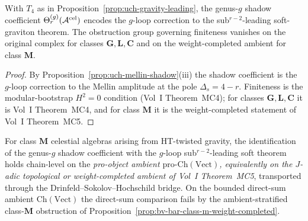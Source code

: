 \begin{proposition}
\label{prop:uch-gravity-higher-partial}
With $T_4$ as in Proposition~\ref{prop:uch-gravity-leading},
the genus-$g$ shadow coefficient
$\Theta_r^{(g)}(\mathcal A^{\mathrm{cel}})$ encodes the $g$-loop correction
to the sub${}^{r-2}$-leading soft-graviton theorem. The obstruction
group governing finiteness vanishes on the original complex for
classes $\mathbf G, \mathbf L, \mathbf C$ and on the
weight-completed ambient for class $\mathbf M$.
\end{proposition}

\begin{proof}
By Proposition~\ref{prop:uch-mellin-shadow}(iii) the shadow
coefficient is the $g$-loop correction to the Mellin amplitude at the
pole $\Delta_s = 4 - r$. Finiteness is the modular-bootstrap
$H^2 = 0$ condition (Vol~I Theorem~MC4); for classes
$\mathbf G, \mathbf L, \mathbf C$ it is Vol~I Theorem~MC4, and for
class $\mathbf M$ it is the weight-completed statement of Vol~I
Theorem~MC5.
\end{proof}

\begin{theorem}
\label{thm:uch-gravity-chain-level}
For class $\mathbf M$ celestial algebras arising from HT-twisted
gravity, the identification of the genus-$g$ shadow coefficient with
the $g$-loop sub${}^{r-2}$-leading soft theorem holds chain-level on
the \emph{pro-object ambient $\mathrm{pro}\text{-}\mathrm{Ch}(\mathrm{Vect})$,
equivalently on the $J$-adic topological or weight-completed ambient
of Vol~I Theorem~MC5}, transported through the
Drinfeld--Sokolov--Hochschild bridge. On the bounded direct-sum
ambient $\mathrm{Ch}(\mathrm{Vect})$ the direct-sum comparison fails
by the ambient-stratified class-$\mathbf M$ obstruction of
Proposition~\ref{prop:bv-bar-class-m-weight-completed}.
\end{theorem}

